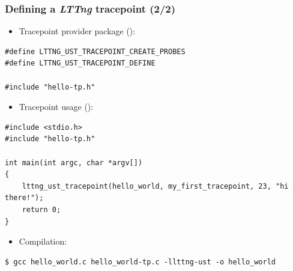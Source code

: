 \begin{frame}[fragile]
  \frametitle{Defining a {\em LTTng} tracepoint (2/2)}
  \begin{itemize}
    \item Tracepoint provider package ():
  \end{itemize}
  \begin{block}{}
    \begin{verbatim}
#define LTTNG_UST_TRACEPOINT_CREATE_PROBES
#define LTTNG_UST_TRACEPOINT_DEFINE

#include "hello-tp.h"
   \end{verbatim}
  \end{block}

  \begin{itemize}
    \item Tracepoint usage ():
  \end{itemize}
  \begin{block}{}
    \begin{verbatim}
#include <stdio.h>
#include "hello-tp.h"

int main(int argc, char *argv[])
{
    lttng_ust_tracepoint(hello_world, my_first_tracepoint, 23, "hi there!");
    return 0;
}
   \end{verbatim}
  \end{block}
  \begin{itemize}
    \item Compilation:
  \end{itemize}
  \begin{block}{}
    \begin{verbatim}
$ gcc hello_world.c hello_world-tp.c -llttng-ust -o hello_world
   \end{verbatim}
  \end{block}
\end{frame}

